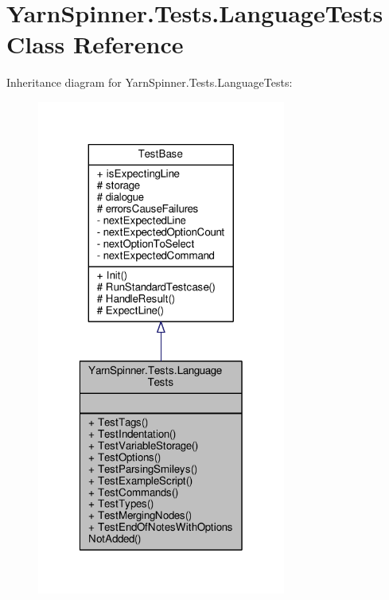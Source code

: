 \hypertarget{a00100}{\section{Yarn\-Spinner.\-Tests.\-Language\-Tests Class Reference}
\label{a00100}
}


Inheritance diagram for Yarn\-Spinner.\-Tests.\-Language\-Tests\-:
\nopagebreak
\begin{figure}[H]
\begin{center}
\leavevmode
\includegraphics[width=232pt]{d4/d91/a00733}
\end{center}
\end{figure}



